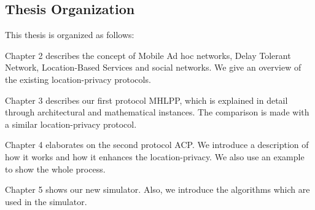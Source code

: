 \subsection{ Thesis Organization}

\noindent This thesis is organized as follows:

Chapter 2 describes the concept of Mobile Ad hoc networks, Delay Tolerant Network, Location-Based Services and social networks. We give an overview of the existing location-privacy protocols.

Chapter 3 describes our first protocol MHLPP, which is explained in detail through architectural and mathematical instances. The comparison is made with a similar location-privacy protocol.

Chapter 4 elaborates on the second protocol ACP. We introduce a description of how it works and how it enhances the location-privacy. We also use an example to show the whole process.

Chapter 5 shows our new simulator. Also, we introduce the algorithms which are used in the simulator.




\begin{comment}


\begin{figure}[H]
  \centering  
  \texttt{[image: figures/map2.pdf]}
  \caption{A map showing the organization of the thesis}
\end{figure}

\end{comment}
